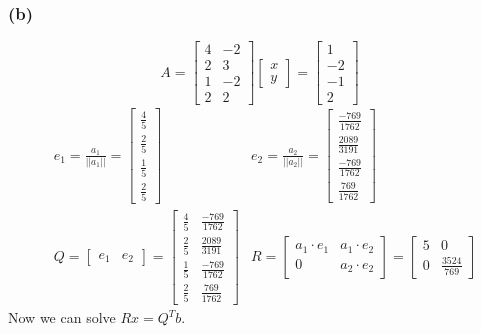 \documentclass[10pt,letterpaper]{article}
\begin{document}
	\subsubsection*{(b)}
	$$
	A = \begin{bmatrix}
	4 & -2 \\ 2 & 3 \\ 1 & -2 \\ 2 & 2
	\end{bmatrix} \begin{bmatrix}
	x \\ y
	\end{bmatrix} = \begin{bmatrix}
	1 \\ -2 \\ -1 \\ 2
	\end{bmatrix}
	$$
	\begin{align*}
	& e_1 = \frac{a_1}{||a_1||} = \begin{bmatrix}
	\frac{4}{5} \\ \frac{2}{5}  \\ \frac{1}{5} \\ \frac{2}{5}
	\end{bmatrix} & e_2 = \frac{a_2}{||a_2||} = \begin{bmatrix}
	\frac{-769}{1762} \\ \frac{2089}{3191}  \\ \frac{-769}{1762} \\ \frac{769}{1762}
	\end{bmatrix} \\
	& Q = \begin{bmatrix}
	e_1 & e_2 
	\end{bmatrix} = \begin{bmatrix}
	\frac{4}{5} & \frac{-769}{1762}\\ \frac{2}{5} & \frac{2089}{3191}  \\ \frac{1}{5} & \frac{-769}{1762} \\ \frac{2}{5} & \frac{769}{1762}
	\end{bmatrix} &  R = \begin{bmatrix}
	a_1 \cdot e_1 & a_1 \cdot e_2 \\ 0 & a_2 \cdot e_2
	\end{bmatrix} = \begin{bmatrix}
	5 & 0 \\ 0 & \frac{3524}{769}
	\end{bmatrix}
	\end{align*}
	Now we can solve $Rx = Q^Tb$.
\end{document}
